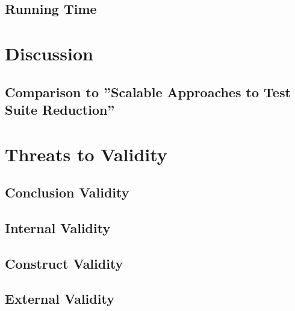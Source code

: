 \subsection{Running Time}

\section{Discussion}

\subsection{Comparison to ''Scalable Approaches to Test Suite Reduction''}

\section{Threats to Validity}

\subsection{Conclusion Validity}

\subsection{Internal Validity}

\subsection{Construct Validity}

\subsection{External Validity}
